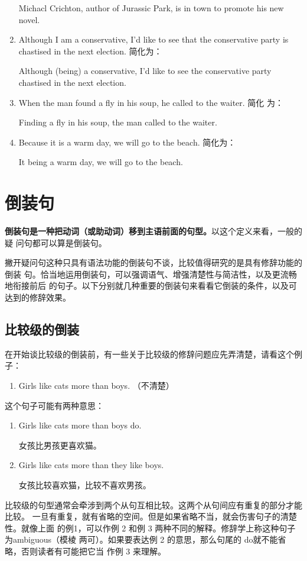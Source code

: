 \begin{enumerate}
  Michacl Crichton, author of Jurassic Park, is in town to promote his new
  novel.
\item Although I am a conservative, I'd like to see that the conservative party
  is chastised in the next election. 简化为：

  Although (being) a conservative, I'd like to see the conservative party
  chastised in the next election.
\item When the man found a fly in his soup, he called to the waiter. 简化
  为：

  Finding a fly in his soup, the man called to the waiter.
\item Because it is a warm day, we will go to the beach. 简化为：

  It being a warm day, we will go to the beach.
\end{enumerate}
\chapter{倒装句}

\textbf{倒装句是一种把动词（或助动词）移到主语前面的句型。}以这个定义来看，一般的疑
问句都可以算是倒装句。

撇开疑问句这种只具有语法功能的倒装句不谈，比较值得研究的是具有修辞功能的倒装
句。恰当地运用倒装句，可以强调语气、增强清楚性与简洁性，以及更流畅地衔接前后
的句子。以下分别就几种重要的倒装句来看看它倒装的条件，以及可达到的修辞效果。

\section{比较级的倒装}

在开始谈比较级的倒装前，有一些关于比较级的修辞问题应先弄清楚，请看这个例子：
\begin{enumerate}
\item Girls like cats more than boys. （不清楚）
\end{enumerate}
这个句子可能有两种意思：
\begin{enumerate}[resume]
\item Girls like cats more than boys do.

  女孩比男孩更喜欢猫。
\item Girls like cats more than they like boys.

  女孩比较喜欢猫，比较不喜欢男孩。
\end{enumerate}

比较级的句型通常会牵涉到两个从句互相比较。这两个从句间应有重复的部分才能比较。
一旦有重复，就有省略的空间。但是如果省略不当，就会伤害句子的清楚性。就像上面
的例1，可以作例 2 和例 3 两种不同的解释。修辞学上称这种句子为ambiguous（模棱
两可）。如果要表达例 2 的意思，那么句尾的 do就不能省略，否则读者有可能把它当
作例 3 来理解。

